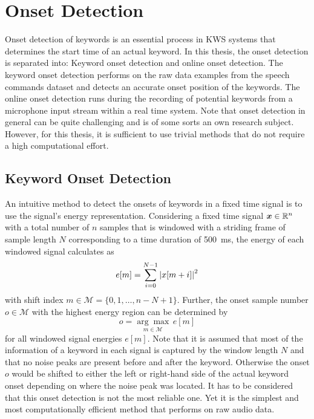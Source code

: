 
\section{Onset Detection}\label{sec:signal_onset}
Onset detection of keywords is an essential process in KWS systems that determines the start time of an actual keyword.
In this thesis, the onset detection is separated into: Keyword onset detection and online onset detection.
The keyword onset detection performs on the raw data examples from the speech commands dataset and detects an accurate onset position of the keywords.
The online onset detection runs during the recording of potential keywords from a microphone input stream within a real time system.
Note that onset detection in general can be quite challenging and is of some sorts an own research subject.
However, for this thesis, it is sufficient to use trivial methods that do not require a high computational effort.



\subsection{Keyword Onset Detection}\label{sec:signal_onset_kw}
An intuitive method to detect the onsets of keywords in a fixed time signal is to use the signal's energy representation.
Considering a fixed time signal $\bm{x} \in \mathbb{R}^n$ with a total number of $n$ samples that is windowed with a striding frame of sample length $N$ corresponding to a time duration of \SI{500}{\milli\second}, the energy of each windowed signal calculates as
\begin{equation}\label{eq:e_win}
  e[m] = \sum_{i=0}^{N-1} \abs{x[m + i]}^2
\end{equation}
with shift index $m \in \mathcal{M} = \{0, 1, \dots, n - N + 1\}$.
Further, the onset sample number $o \in \mathcal{M}$ with the highest energy region can be determined by
\begin{equation}\label{eq:onset}
  o = \underset{m \in \mathcal{M}}{\arg \max} \, e[m]
\end{equation}
for all windowed signal energies $e[m]$.
Note that it is assumed that most of the information of a keyword in each signal is captured by the window length $N$ and that no noise peaks are present before and after the keyword. 
Otherwise the onset $o$ would be shifted to either the left or right-hand side of the actual keyword onset depending on where the noise peak was located.
It has to be considered that this onset detection is not the most reliable one. 
Yet it is the simplest and most computationally efficient method that performs on raw audio data.

